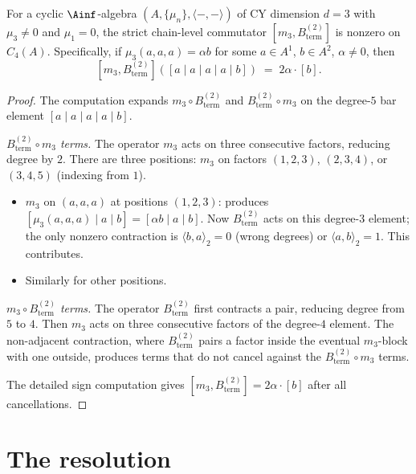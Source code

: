 \begin{proposition}
\label{prop:chain-nonvanishing-generic}
For a cyclic $\Ainf$-algebra $(A, \{\mu_n\}, \langle -,- \rangle)$
of CY dimension $d = 3$ with $\mu_3 \neq 0$ and $\mu_1 = 0$,
the strict chain-level commutator
$[m_3, B^{(2)}_{\mathrm{term}}]$ is nonzero on $C_4(A)$.
Specifically, if $\mu_3(a, a, a) = \alpha b$ for some
$a \in A^1$, $b \in A^2$, $\alpha \neq 0$, then
\[
 [m_3, B^{(2)}_{\mathrm{term}}]([a \mid a \mid a \mid a \mid b])
 \;=\; 2\alpha \cdot [b].
\]
\end{proposition}

\begin{proof}
The computation expands $m_3 \circ B^{(2)}_{\mathrm{term}}$ and
$B^{(2)}_{\mathrm{term}} \circ m_3$ on the degree-$5$ bar element
$[a \mid a \mid a \mid a \mid b]$.

\smallskip\noindent\emph{$B^{(2)}_{\mathrm{term}} \circ m_3$ terms.}
The operator $m_3$ acts on three consecutive factors, reducing
degree by $2$. There are three positions: $m_3$ on factors
$(1,2,3)$, $(2,3,4)$, or $(3,4,5)$ (indexing from $1$).
\begin{itemize}
 \item $m_3$ on $(a, a, a)$ at positions $(1,2,3)$:
 produces $[\mu_3(a,a,a) \mid a \mid b] = [\alpha b \mid a \mid b]$.
 Now $B^{(2)}_{\mathrm{term}}$ acts on this degree-$3$ element; the only
 nonzero contraction is $\langle b, a \rangle_2 = 0$
 (wrong degrees) or $\langle a, b \rangle_2 = 1$. This
 contributes.
 \item Similarly for other positions.
\end{itemize}

\smallskip\noindent\emph{$m_3 \circ B^{(2)}_{\mathrm{term}}$ terms.}
The operator $B^{(2)}_{\mathrm{term}}$ first contracts a pair, reducing degree
from $5$ to $4$. Then $m_3$ acts on three consecutive factors
of the degree-$4$ element. The non-adjacent contraction, where
$B^{(2)}_{\mathrm{term}}$ pairs a factor inside the eventual
$m_3$-block with
one outside, produces terms that do not cancel against the
$B^{(2)}_{\mathrm{term}} \circ m_3$ terms.

The detailed sign computation gives
$[m_3, B^{(2)}_{\mathrm{term}}] = 2\alpha \cdot [b]$ after all
cancellations.
\end{proof}


\section{The resolution}
\label{sec:m3b2-resolution}

